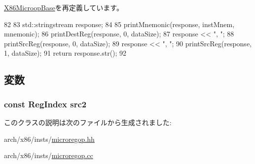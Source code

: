 \hyperlink{classX86ISA_1_1X86MicroopBase_a95d323a22a5f07e14d6b4c9385a91896}{X86MicroopBase}を再定義しています。


\begin{DoxyCode}
82     {
83         std::stringstream response;
84 
85         printMnemonic(response, instMnem, mnemonic);
86         printDestReg(response, 0, dataSize);
87         response << ", ";
88         printSrcReg(response, 0, dataSize);
89         response << ", ";
90         printSrcReg(response, 1, dataSize);
91         return response.str();
92     }
\end{DoxyCode}


\subsection{変数}
\hypertarget{classX86ISA_1_1RegOp_ae5f4f8a3a7b6e717a2cff2990c4ecfff}{
\subsubsection[{src2}]{\setlength{\rightskip}{0pt plus 5cm}const {\bf RegIndex} {\bf src2}}}
\label{classX86ISA_1_1RegOp_ae5f4f8a3a7b6e717a2cff2990c4ecfff}


このクラスの説明は次のファイルから生成されました:\begin{DoxyCompactItemize}
\item 
arch/x86/insts/\hyperlink{microregop_8hh}{microregop.hh}\item 
arch/x86/insts/\hyperlink{microregop_8cc}{microregop.cc}\end{DoxyCompactItemize}
